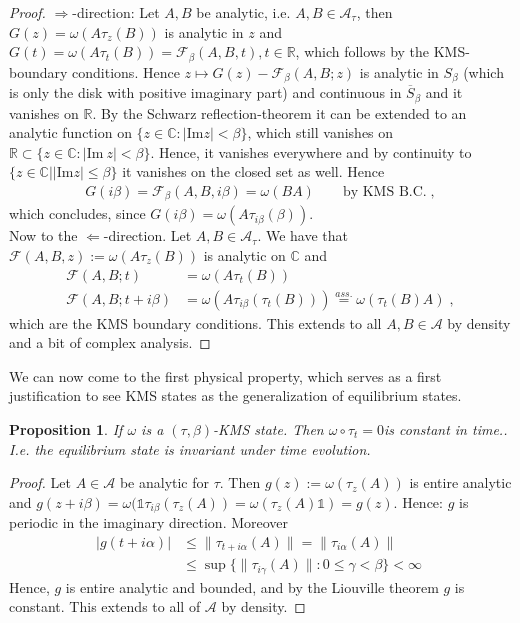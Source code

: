 \documentclass[
a4paper, %
11pt, %
onecolumn, %
openany, %
]{memoir}
\theoremstyle{definition}
\theoremstyle{remark}
\theoremstyle{plain}
\newtheorem{prop}[definition]{Proposition}
\begin{document}
\begin{proof}
	$\Rightarrow$-direction: Let $A,B$ be analytic, i.e. $A,B\in\mathcal{A}_{\tau}$, then  $G(z)=\omega(A\tau_z(B))$ is analytic in $z$ and $G(t)=\omega(A\tau_t(B))=\mathcal{F}_{\beta}(A,B,t),t\in\mathbb{R}$, which follows by the KMS-boundary conditions. Hence $z\mapsto G(z)-\mathcal{F}_{\beta}(A,B;z)$ is analytic in $S_{\beta}$ (which is only the disk with positive imaginary part) and continuous in $\overline{S}_{\beta}$ and it vanishes on $\mathbb{R}$. By the Schwarz reflection-theorem it can be extended to an analytic function on $\{z\in\mathbb{C}:|\mathrm{Im}z|<\beta\}$, which still vanishes on $\mathbb{R}\subset \{z\in\mathbb{C}:|\mathrm{Im}~z|<\beta\}$. Hence, it vanishes everywhere and by continuity to $\{z\in\mathbb{C}||\mathrm{Im}z|\leq \beta\}$ it vanishes on the closed set as well. Hence \begin{align}
	G(i\beta)=\mathcal{F}_{\beta}(A,B,i\beta)=\omega(BA) \qquad \text{by KMS B.C.}\;,
	\end{align}
	which concludes, since $G(i\beta)=\omega(A\tau_{i\beta}(\beta))$.\\Now to the $\Leftarrow$-direction. Let $A,B\in\mathcal{A}_{\tau}$. We have that $\mathcal{F}(A,B,z):=\omega(A\tau_z(B))$ is analytic on $\mathbb{C}$ and \begin{align}
	\mathcal{F}(A,B;t)&=\omega(A\tau_t(B))\\
	\mathcal{F}(A,B;t+i\beta)&=\omega(A\tau_{i\beta}(\tau_t(B)))\overset{ass.}{=}\omega(\tau_t(B)A)\; ,
	\end{align}
which are the KMS boundary conditions. This extends to all $A,B\in\mathcal{A}$ by density and a bit of complex analysis.\end{proof}
We can now come to the first physical property, which serves as a first justification to see KMS states as the generalization of equilibrium states. \begin{prop}
	If $\omega$ is a $(\tau,\beta)$-KMS state. Then $\omega\circ \tau_t=0$is constant in time.. I.e. the equilibrium state is invariant under time evolution.
\end{prop}
\begin{proof}
	Let $A\in\mathcal{A}$ be analytic for $\tau$. Then $g(z):=\omega(\tau_z(A))$ is entire analytic and $g(z+i\beta)=\omega(\mathds{1}\tau_{i\beta}(\tau_z(A))=\omega(\tau_z(A)\mathds{1})=g(z)$. Hence: $g$ is periodic in the imaginary direction. Moreover \begin{align}
	|g(t+i\alpha)|&\leq \|\tau_{t+i\alpha}(A)\|=\|\tau_{i\alpha}(A)\| \\
	&\leq \sup\{\|\tau_{i\gamma}(A)\|:0\leq \gamma <\beta\} < \infty\; 
	\end{align}
	Hence, $g$ is entire analytic and bounded, and by the Liouville theorem $g$ is constant. This extends to all of $\mathcal{A}$ by density.
\end{proof}
\end{document}
